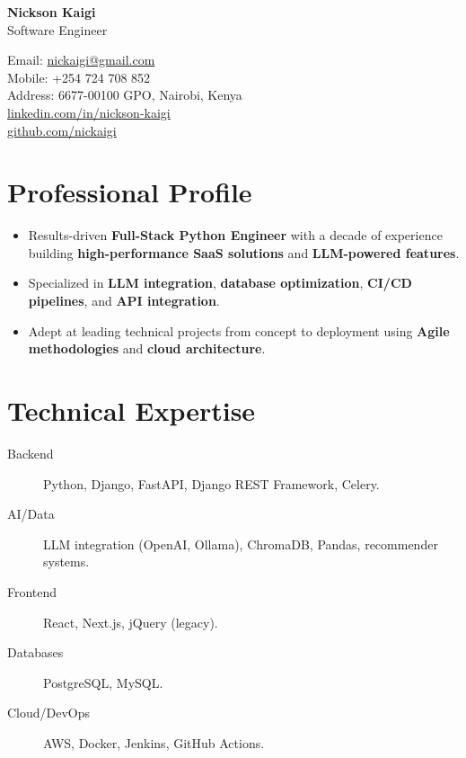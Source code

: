 \documentclass[11pt]{article}
\begin{document}
\begin{center}
    \begin{minipage}{0.5\textwidth}
    {\Huge\bfseries Nickson Kaigi}\\ \medskip
        Software Engineer
    \end{minipage} \hfill
    \begin{minipage}{0.4\textwidth}
        \raggedleft
        Email: \href{mailto:nickaigi@gmail.com}{nickaigi@gmail.com} \\
        Mobile: +254 724 708 852 \\
        Address: 6677-00100 GPO, Nairobi, Kenya \\
        \href{https://www.linkedin.com/in/nickson-kaigi/}{linkedin.com/in/nickson-kaigi} \\
        \href{https://github.com/nickaigi}{github.com/nickaigi}
    \end{minipage}
\end{center}

\section{Professional Profile}
\begin{itemize}
    \item Results-driven \textbf{Full-Stack Python Engineer} with a decade of experience building \textbf{high-performance SaaS solutions} and \textbf{LLM-powered features}.
    \item Specialized in \textbf{LLM integration}, \textbf{database optimization}, \textbf{CI/CD pipelines}, and \textbf{API integration}.
    \item Adept at leading technical projects from concept to deployment using \textbf{Agile methodologies} and \textbf{cloud architecture}.
\end{itemize}

\section{Technical Expertise}
\begin{description}
    \item[Backend] Python, Django, FastAPI, Django REST Framework, Celery.
    \item[AI/Data] LLM integration (OpenAI, Ollama), ChromaDB, Pandas, recommender systems.
    \item[Frontend] React, Next.js, jQuery (legacy).
    \item[Databases] PostgreSQL, MySQL.
    \item[Cloud/DevOps] AWS, Docker, Jenkins, GitHub Actions.
\end{description}
\end{document}
